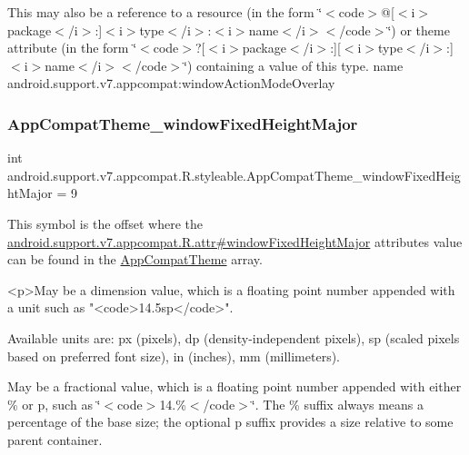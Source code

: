 This may also be a reference to a resource (in the form \char`\"{}$<$code$>$@\mbox{[}$<$i$>$package$<$/i$>$\+:\mbox{]}$<$i$>$type$<$/i$>$\+:$<$i$>$name$<$/i$>$$<$/code$>$\char`\"{}) or theme attribute (in the form \char`\"{}$<$code$>$?\mbox{[}$<$i$>$package$<$/i$>$\+:\mbox{]}\mbox{[}$<$i$>$type$<$/i$>$\+:\mbox{]}$<$i$>$name$<$/i$>$$<$/code$>$\char`\"{}) containing a value of this type.  name android.\+support.\+v7.\+appcompat\+:window\+Action\+Mode\+Overlay \mbox{\label{classandroid_1_1support_1_1v7_1_1appcompat_1_1R_1_1styleable_ad39d6f1f8f5f5276ffcd26e8ba52a62a}} 
\subsubsection{\texorpdfstring{App\+Compat\+Theme\+\_\+window\+Fixed\+Height\+Major}{AppCompatTheme\_windowFixedHeightMajor}}
{\footnotesize\ttfamily int android.\+support.\+v7.\+appcompat.\+R.\+styleable.\+App\+Compat\+Theme\+\_\+window\+Fixed\+Height\+Major = 9\hspace{0.3cm}{\ttfamily [static]}}

This symbol is the offset where the \hyperlink{classandroid_1_1support_1_1v7_1_1appcompat_1_1R_1_1attr_a568ba891a04bf2c4a15c2ead6fbea181}{android.\+support.\+v7.\+appcompat.\+R.\+attr\#window\+Fixed\+Height\+Major} attribute\textquotesingle{}s value can be found in the \hyperlink{classandroid_1_1support_1_1v7_1_1appcompat_1_1R_1_1styleable_a5c42f89e8a410c323be34208d75c430b}{App\+Compat\+Theme} array.

\begin{DoxyVerb}      <p>May be a dimension value, which is a floating point number appended with a unit such as "<code>14.5sp</code>".
\end{DoxyVerb}
 Available units are\+: px (pixels), dp (density-\/independent pixels), sp (scaled pixels based on preferred font size), in (inches), mm (millimeters). 

May be a fractional value, which is a floating point number appended with either \% or p, such as \char`\"{}$<$code$>$14.\%$<$/code$>$\char`\"{}. The \% suffix always means a percentage of the base size; the optional p suffix provides a size relative to some parent container. 


